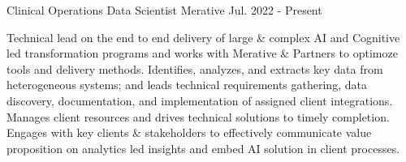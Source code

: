 

\begin{cventries}

  \cventry
    {Clinical Operations} %
    {Data Scientist} %
    {Merative}
    {Jul. 2022 - Present}
    {
      \begin{cvcompactparagraph}
        Technical lead on the end to end delivery of large \& complex AI and Cognitive led transformation programs and works with Merative \& Partners to optimoze tools and delivery methods.  Identifies, analyzes, and extracts key data from heterogeneous systems; and leads technical requirements gathering, data discovery, documentation, and implementation of assigned client integrations.  Manages client resources and drives technical solutions to timely completion.  Engages with key clients \& stakeholders to effectively communicate value proposition on analytics led insights and embed AI solution in client processes.
      \end{cvcompactparagraph}
    }


\end{cventries}
